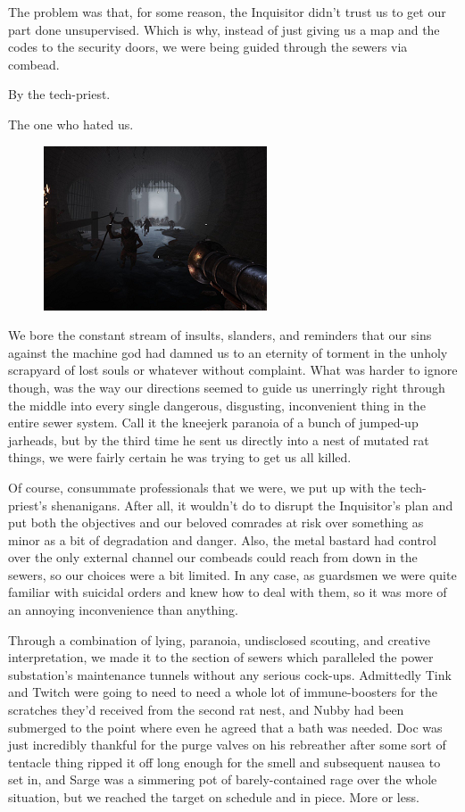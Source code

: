 The problem was that, for some reason, the Inquisitor didn't trust us to get our part done unsupervised. 
Which is why, instead of just giving us a map and the codes to the security doors, we were being guided through the sewers via combead. 


By the tech-priest. 


The one who hated us.

\begin{figure}
	\begin{center}
		\includegraphics[width=\figwidth]{pics/18/6.png}
	\end{center}
\end{figure}
We bore the constant stream of insults, slanders, and reminders that our sins against the machine god had damned us to an eternity of torment in the unholy scrapyard of lost souls or whatever without complaint. 
What was harder to ignore though, was the way our directions seemed to guide us unerringly right through the middle into every single dangerous, disgusting, inconvenient thing in the entire sewer system. 
Call it the kneejerk paranoia of a bunch of jumped-up jarheads, but by the third time he sent us directly into a nest of mutated rat things, we were fairly certain he was trying to get us all killed. 


Of course, consummate professionals that we were, we put up with the tech-priest's shenanigans. 
After all, it wouldn't do to disrupt the Inquisitor's plan and put both the objectives and our beloved comrades at risk over something as minor as a bit of degradation and danger. 
Also, the metal bastard had control over the only external channel our combeads could reach from down in the sewers, so our choices were a bit limited. 
In any case, as guardsmen we were quite familiar with suicidal orders and knew how to deal with them, so it was more of an annoying inconvenience than anything.

Through a combination of lying, paranoia, undisclosed scouting, and creative interpretation, we made it to the section of sewers which paralleled the power substation's maintenance tunnels without any serious cock-ups. 
Admittedly Tink and Twitch were going to need to need a whole lot of immune-boosters for the scratches they'd received from the second rat nest, and Nubby had been submerged to the point where even he agreed that a bath was needed. 
Doc was just incredibly thankful for the purge valves on his rebreather after some sort of tentacle thing ripped it off long enough for the smell and subsequent nausea to set in, and Sarge was a simmering pot of barely-contained rage over the whole situation, but we reached the target on schedule and in piece. 
More or less.

